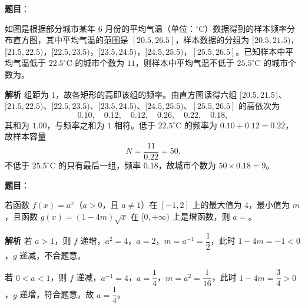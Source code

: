 \begin{answer}

\textbf{题目}：

如图是根据部分城市某年 $6$ 月份的平均气温（单位：$^\circ\mathrm C$）数据得到的样本频率分布直方图，其中平均气温的范围是 $[20.5,26.5]$，样本数据的分组为 $[20.5,21.5)$，$[21.5,22.5)$，$[22.5,23.5)$，$[23.5,24.5)$，$[24.5,25.5)$，$[25.5,26.5]$。已知样本中平均气温低于 $22.5^\circ\mathrm C$ 的城市个数为 $11$，则样本中平均气温不低于 $25.5^\circ\mathrm C$ 的城市个数为\gkblank{}。
\nopagebreak[4]
\begin{center}\end{center}
\nopagebreak[4]
\textbf{解析}
组距为 $1$，故各矩形的高即该组的频率。由直方图读得六组 $[20.5,21.5)$、$[21.5,22.5)$、$[22.5,23.5)$、$[23.5,24.5)$、$[24.5,25.5)$、$[25.5,26.5]$ 的高依次为
\nopagebreak[4]
\[0.10,\quad0.12,\quad0.12,\quad0.26,\quad0.22,\quad0.18,\]
其和为 $1.00$，与频率之和为 $1$ 相符。低于 $22.5^\circ\mathrm C$ 的频率为 $0.10+0.12=0.22$，故样本容量
\nopagebreak[4]
\[N=\frac{11}{0.22}=50.\]
不低于 $25.5^\circ\mathrm C$ 的只有最后一组，频率 $0.18$，故城市个数为 $50\times0.18=9$。


\end{answer}
\begin{answer}

\textbf{题目}：

若函数 $f(x)=a^x$（$a>0$，且 $a\neq1$）在 $[-1,2]$ 上的最大值为 $4$，最小值为 $m$，且函数 $g(x)=(1-4m)\sqrt x$ 在 $[0,+\infty)$ 上是增函数，则 $a=$\gkblank{}。

\textbf{解析}
若 $a>1$，则 $f$ 递增，$a^2=4$，$a=2$，$m=a^{-1}=\dfrac12$，此时 $1-4m=-1<0$，$g$ 递减，不合题意。

若 $0<a<1$，则 $f$ 递减，$a^{-1}=4$，$a=\dfrac14$，$m=a^2=\dfrac1{16}$，此时 $1-4m=\dfrac34>0$，$g$ 递增，符合题意。故 $a=\dfrac14$。


\end{answer}
